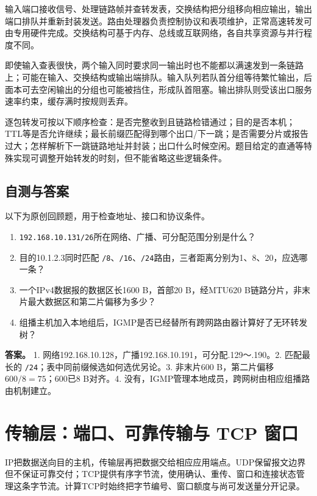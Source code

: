 输入端口接收信号、处理链路帧并查转发表，交换结构把分组移向相应输出，输出端口排队并重新封装发送。路由处理器负责控制协议和表项维护，正常高速转发可由专用硬件完成。交换结构可基于内存、总线或互联网络，各自共享资源与并行程度不同。

即使输入查表很快，两个输入同时要求同一输出时也不能都以满速发到一条链路上；可能在输入、交换结构或输出端排队。输入队列若队首分组等待繁忙输出，后面本可去空闲输出的分组也可能被挡住，形成队首阻塞。输出排队则受该出口服务速率约束，缓存满时按规则丢弃。

逐包转发可按以下顺序检查：是否完整收到且链路检错通过；目的是否本机；TTL等是否允许继续；最长前缀匹配得到哪个出口/下一跳；是否需要分片或报告过大；怎样解析下一跳链路地址并封装；出口什么时候空闲。题目给定的直通等特殊实现可调整开始转发的时刻，但不能省略这些逻辑条件。

\section{自测与答案}\label{cn-ch4-review}

以下为原创回顾题，用于检查地址、接口和协议条件。

\begin{enumerate}
\def\labelenumi{\arabic{enumi}.}
\tightlist
\item
  \allowbreak{}\texttt{192.168.10.131/26}所在网络、广播、可分配范围分别是什么？
\item
  目的10.1.2.3同时匹配 \allowbreak{}\texttt{/8}、\allowbreak{}\texttt{/16}、\allowbreak{}\texttt{/24}路由，三者距离分别为1、8、20，应选哪一条？
\item
  一个IPv4数据报的数据区长1600 B，首部20 B，经MTU620 B链路分片，非末片最大数据区和第二片偏移为多少？
\item
  组播主机加入本地组后，IGMP是否已经替所有跨网路由器计算好了无环转发树？
\end{enumerate}

\textbf{答案。} 1. 网络192.168.10.128，广播192.168.10.191，可分配.129～.190。2. 匹配最长的 \allowbreak{}\texttt{/24}；表中同前缀候选如何选优另论。3. 非末片600 B，第二片偏移 \(600/8=75\)；600已8 B对齐。4. 没有，IGMP管理本地成员，跨网树由相应组播路由机制建立。

\chapter{传输层：端口、可靠传输与 TCP 窗口}\label{cn-ch5}

IP把数据送向目的主机，传输层再把数据交给相应应用端点。UDP保留报文边界但不保证可靠交付；TCP提供有序字节流，使用确认、重传、窗口和连接状态管理这条字节流。计算TCP时始终把字节编号、窗口额度与尚可发送量分开记录。

